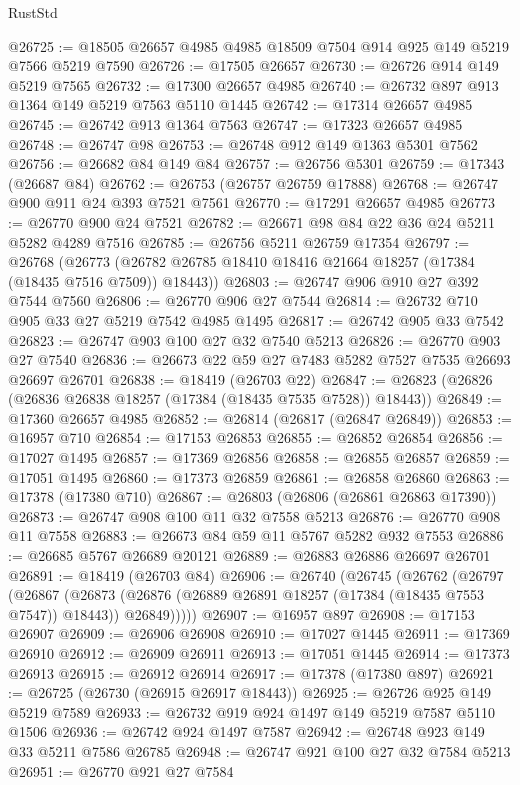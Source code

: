 \begin{lexlean}{RustStd}
\begin{coremodule}
@26725 := @18505 @26657 @4985 @4985 @18509 @7504 @914 @925 @149 @5219 @7566 @5219 @7590
@26726 := @17505 @26657
@26730 := @26726 @914 @149 @5219 @7565
@26732 := @17300 @26657 @4985
@26740 := @26732 @897 @913 @1364 @149 @5219 @7563 @5110 @1445
@26742 := @17314 @26657 @4985
@26745 := @26742 @913 @1364 @7563
@26747 := @17323 @26657 @4985
@26748 := @26747 @98
@26753 := @26748 @912 @149 @1363 @5301 @7562
@26756 := @26682 @84 @149 @84
@26757 := @26756 @5301
@26759 := @17343 (@26687 @84)
@26762 := @26753 (@26757 @26759 @17888)
@26768 := @26747 @900 @911 @24 @393 @7521 @7561
@26770 := @17291 @26657 @4985
@26773 := @26770 @900 @24 @7521
@26782 := @26671 @98 @84 @22 @36 @24 @5211 @5282 @4289 @7516
@26785 := @26756 @5211 @26759 @17354
@26797 := @26768
    (@26773 (@26782 @26785 @18410 @18416 @21664 @18257 (@17384 (@18435 @7516 @7509)) @18443))
@26803 := @26747 @906 @910 @27 @392 @7544 @7560
@26806 := @26770 @906 @27 @7544
@26814 := @26732 @710 @905 @33 @27 @5219 @7542 @4985 @1495
@26817 := @26742 @905 @33 @7542
@26823 := @26747 @903 @100 @27 @32 @7540 @5213
@26826 := @26770 @903 @27 @7540
@26836 := @26673 @22 @59 @27 @7483 @5282 @7527 @7535 @26693 @26697 @26701
@26838 := @18419 (@26703 @22)
@26847 := @26823 (@26826 (@26836 @26838 @18257 (@17384 (@18435 @7535 @7528)) @18443))
@26849 := @17360 @26657 @4985
@26852 := @26814 (@26817 (@26847 @26849))
@26853 := @16957 @710
@26854 := @17153 @26853
@26855 := @26852 @26854
@26856 := @17027 @1495
@26857 := @17369 @26856
@26858 := @26855 @26857
@26859 := @17051 @1495
@26860 := @17373 @26859
@26861 := @26858 @26860
@26863 := @17378 (@17380 @710)
@26867 := @26803 (@26806 (@26861 @26863 @17390))
@26873 := @26747 @908 @100 @11 @32 @7558 @5213
@26876 := @26770 @908 @11 @7558
@26883 := @26673 @84 @59 @11 @5767 @5282 @932 @7553
@26886 := @26685 @5767 @26689 @20121
@26889 := @26883 @26886 @26697 @26701
@26891 := @18419 (@26703 @84)
@26906 := @26740
    (@26745
      (@26762
        (@26797
          (@26867
            (@26873 (@26876 (@26889 @26891 @18257 (@17384 (@18435 @7553 @7547)) @18443)) @26849)))))
@26907 := @16957 @897
@26908 := @17153 @26907
@26909 := @26906 @26908
@26910 := @17027 @1445
@26911 := @17369 @26910
@26912 := @26909 @26911
@26913 := @17051 @1445
@26914 := @17373 @26913
@26915 := @26912 @26914
@26917 := @17378 (@17380 @897)
@26921 := @26725 (@26730 (@26915 @26917 @18443))
@26925 := @26726 @925 @149 @5219 @7589
@26933 := @26732 @919 @924 @1497 @149 @5219 @7587 @5110 @1506
@26936 := @26742 @924 @1497 @7587
@26942 := @26748 @923 @149 @33 @5211 @7586 @26785
@26948 := @26747 @921 @100 @27 @32 @7584 @5213
@26951 := @26770 @921 @27 @7584

\end{coremodule}
\end{lexlean}
